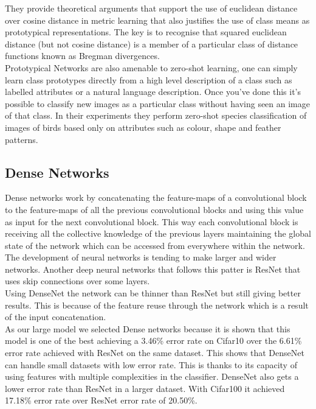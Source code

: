 They provide theoretical arguments that support the use of euclidean distance over cosine distance in metric learning that also justifies the use of class means as prototypical representations. The key is to recognise that squared euclidean distance (but not cosine distance) is a member of a particular class of distance functions known as Bregman divergences. \\

Prototypical Networks are also amenable to zero-shot learning, one can simply learn class prototypes directly from a high level description of a class such as labelled attributes or a natural language description. Once you’ve done this it’s possible to classify new images as a particular class without having seen an image of that class. In their experiments they perform zero-shot species classification of images of birds based only on attributes such as colour, shape and feather patterns.

\subsection{Dense Networks}

Dense networks \cite{densenet} work by concatenating the feature-maps of a convolutional block to the feature-maps of all the previous convolutional blocks and using this value as input for the next convolutional block. This way each convolutional block is receiving all the collective knowledge of the previous layers maintaining the global state of the network which can be accessed from everywhere within the network. \\

The development of neural networks is tending to make larger and wider networks. Another deep neural networks that follows this patter is ResNet \cite{resnet} that uses skip connections over some layers. \\
Using DenseNet the network can be thinner than ResNet but still giving better results. This is because of the feature reuse through the network which is a result of the input concatenation. \\

As our large model we selected Dense networks because it is shown that this model is one of the best achieving a 3.46\% error rate on Cifar10 over the 6.61\% error rate achieved with ResNet on the same dataset\cite{densenet_cifar}. This shows that DenseNet can handle small datasets with low error rate. This is thanks to its capacity of using features with multiple complexities in the classifier. DenseNet also gets a lower error rate than ResNet in a larger dataset. With Cifar100 it achieved 17.18\% error rate over ResNet error rate of 20.50\%. \\

